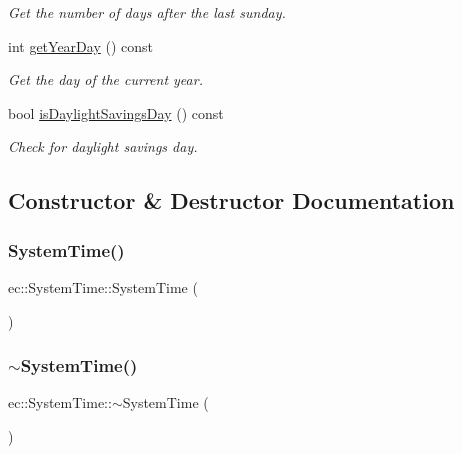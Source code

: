 \begin{DoxyCompactItemize}
\begin{DoxyCompactList}\small\item\em Get the number of days after the last sunday. \end{DoxyCompactList}\item 
int \mbox{\hyperlink{classec_1_1_system_time_ad7e667e80111e8ebc99221075eab8948}{get\+Year\+Day}} () const
\begin{DoxyCompactList}\small\item\em Get the day of the current year. \end{DoxyCompactList}\item 
bool \mbox{\hyperlink{classec_1_1_system_time_abe57dcc7983076e92b7d8b3d32c021bf}{is\+Daylight\+Savings\+Day}} () const
\begin{DoxyCompactList}\small\item\em Check for daylight savings day. \end{DoxyCompactList}\end{DoxyCompactItemize}


\subsection{Constructor \& Destructor Documentation}
\mbox{\label{classec_1_1_system_time_ab37ecc2b60896c51db31e6272728a0ba}} 
\subsubsection{\texorpdfstring{System\+Time()}{SystemTime()}}
{\footnotesize\ttfamily ec\+::\+System\+Time\+::\+System\+Time (\begin{DoxyParamCaption}{ }\end{DoxyParamCaption})\hspace{0.3cm}{\ttfamily [explicit]}}

\mbox{\label{classec_1_1_system_time_af227490217275ef710940bcd18569c6d}} 
\subsubsection{\texorpdfstring{$\sim$\+System\+Time()}{~SystemTime()}}
{\footnotesize\ttfamily ec\+::\+System\+Time\+::$\sim$\+System\+Time (\begin{DoxyParamCaption}{ }\end{DoxyParamCaption})\hspace{0.3cm}{\ttfamily [default]}}



